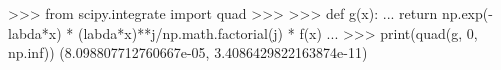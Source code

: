 
>>> from scipy.integrate import quad
>>> 
>>> def g(x):
...     return np.exp(-labda*x) * (labda*x)**j/np.math.factorial(j) * f(x)
... 
>>> print(quad(g, 0, np.inf))
(8.098807712760667e-05, 3.4086429822163874e-11)
